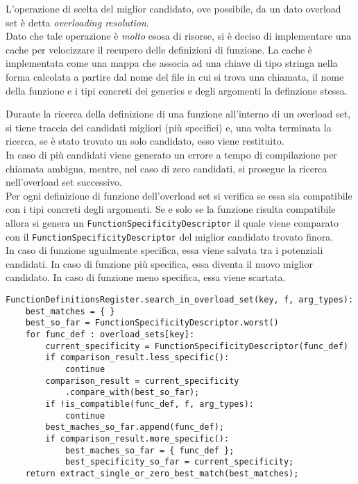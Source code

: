 L'operazione di scelta del miglior candidato, ove possibile, da un dato overload set è detta \textit{overloading resolution}. \\

Dato che tale operazione è \textit{molto} esosa di risorse, si è deciso di implementare una cache per velocizzare
il recupero delle definizioni di funzione. La cache è implementata come una mappa che associa ad una 
chiave di tipo stringa nella forma calcolata a partire dal nome del file in cui si trova una chiamata, il nome 
della funzione e i tipi concreti dei generics e degli argomenti la definzione stessa. \\

\newpage

Durante la ricerca della definizione di una funzione all'interno di un overload set, si tiene traccia dei candidati 
migliori (più specifici) e, una volta terminata la ricerca, se è stato trovato un solo candidato, esso viene restituito. \\

In caso di più candidati viene generato un errore a tempo di compilazione per chiamata ambigua, mentre, nel caso di 
zero candidati, si prosegue la ricerca nell'overload set successivo. \\

Per ogni definizione di funzione dell'overload set si verifica se essa sia compatibile con i tipi concreti 
degli argomenti. Se e solo se la funzione risulta compatibile allora si genera un \texttt{FunctionSpecificityDescriptor} il quale
viene comparato con il \texttt{FunctionSpecificityDescriptor} del miglior candidato trovato finora. \\

In caso di funzione ugualmente specifica, essa viene salvata tra i potenziali candidati. In caso di funzione più specifica, 
essa diventa il nuovo miglior candidato. In caso di funzione meno specifica, essa viene scartata. \\

\vspace{0.5cm}
\begin{lstlisting}[frame=single]
FunctionDefinitionsRegister.search_in_overload_set(key, f, arg_types):
    best_matches = { }
    best_so_far = FunctionSpecificityDescriptor.worst()
    for func_def : overload_sets[key]: 
        current_specificity = FunctionSpecificityDescriptor(func_def)
        if comparison_result.less_specific(): 
            continue
        comparison_result = current_specificity
            .compare_with(best_so_far);
        if !is_compatible(func_def, f, arg_types): 
            continue
        best_maches_so_far.append(func_def);
        if comparison_result.more_specific(): 
            best_maches_so_far = { func_def };
            best_specificity_so_far = current_specificity;
    return extract_single_or_zero_best_match(best_matches);
\end{lstlisting}
\vspace{0.5cm}

